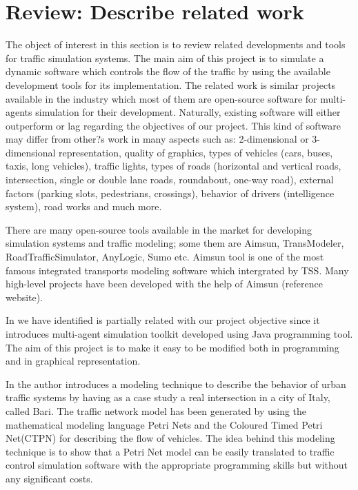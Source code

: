 \documentclass[oneside]{article}
\begin{document}
\section{Review: Describe related work}

The object of interest in this section is to review related developments and tools for traffic simulation systems. The main aim of this project is to simulate a dynamic software which controls the flow of the traffic by using the available development tools for its implementation. The related work is similar projects available in the industry which most of them are open-source software for multi-agents simulation for their development. Naturally, existing software will either outperform or lag regarding the objectives of our project. This kind of software may differ from other?s work in many aspects such as: 2-dimensional or 3-dimensional representation, quality of graphics, types of vehicles (cars, buses, taxis, long vehicles), traffic lights, types of roads (horizontal and vertical roads, intersection, single or double lane roads, roundabout, one-way road), external factors (parking slots, pedestrians, crossings), behavior of drivers (intelligence system), road works and much more. 
\newline

\noindent There are many open-source tools available in the market for developing simulation systems and traffic modeling; some them are Aimsun, TransModeler, RoadTrafficSimulator, AnyLogic, Sumo etc. Aimsun tool is one of the most famous integrated transports modeling software which intergrated by TSS. Many high-level projects have been developed with the help of Aimsun (reference website). 

\noindent In \cite{luke2005mason}we have identified is partially related with our project objective since it introduces multi-agent simulation toolkit developed using Java programming tool. The aim of this project is to make it easy to be modified both in programming and in graphical representation. 

\noindent In \cite{dotoli2006urban} the author introduces a modeling technique to describe the behavior of urban traffic systems by having as a case study a real intersection in a city of Italy, called Bari. The traffic network model has been generated by using the mathematical modeling language Petri Nets and the Coloured Timed Petri Net(CTPN) for describing the flow of vehicles. The idea behind this modeling technique is to show that a Petri Net model can be easily translated to traffic control simulation software with the appropriate programming skills but without any significant costs.
\newline
\end{document}
